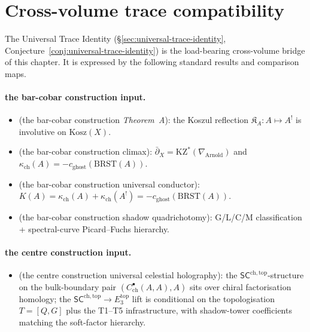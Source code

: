 \section{Cross-volume trace compatibility}
\label{sec:bar-cobar-anchors}

The Universal Trace Identity (\S\ref{sec:universal-trace-identity},
Conjecture~\ref{conj:universal-trace-identity}) is the load-bearing
cross-volume bridge of this chapter. It is expressed by the following
standard results and comparison maps.

\paragraph{the bar-cobar construction input.}
\begin{itemize}
 \item \cite{VolI} (the bar-cobar construction \emph{Theorem~A}):
 the Koszul reflection $\mathfrak{K}_A \colon A \mapsto A^!$ is
 involutive on $\mathrm{Kosz}(X)$.
 \item \cite{VolI} (the bar-cobar construction climax):
 $\bar\partial_X = \mathrm{KZ}^*(\nabla_{\mathrm{Arnold}})$ and
 $\kappa_{\mathrm{ch}}(A) = -c_{\mathrm{ghost}}(\mathrm{BRST}(A))$.
 \item \cite{VolI} (the bar-cobar construction universal conductor):
 $K(A) = \kappa_{\mathrm{ch}}(A) + \kappa_{\mathrm{ch}}(A^!)
 = -c_{\mathrm{ghost}}(\mathrm{BRST}(A))$.
 \item \cite{VolI} (the bar-cobar construction shadow
 quadrichotomy): G/L/C/M classification + spectral-curve
 Picard--Fuchs hierarchy.
\end{itemize}

\paragraph{the centre construction input.}
\begin{itemize}
 \item \cite{VolII} (the centre construction universal
 celestial holography): the $\mathsf{SC}^{\mathrm{ch,top}}$-structure
 on the bulk-boundary pair $(C^\bullet_{\mathrm{ch}}(A,A), A)$ sits
 over chiral factorisation homology; the
 $\mathsf{SC}^{\mathrm{ch,top}} \to E_3^{\mathrm{top}}$ lift is
 conditional on the topologisation $T = [Q, G]$ plus the T1--T5
 infrastructure, with shadow-tower coefficients matching the
 soft-factor hierarchy.
\end{itemize}

